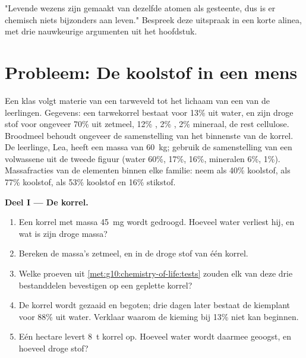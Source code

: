 \begin{exercise}[$\star\star\star$]\label{exo:g10:chemistry-of-life:15}
"Levende wezens zijn gemaakt van dezelfde atomen als gesteente, dus is
er chemisch niets bijzonders aan leven." Bespreek deze uitspraak in een
korte alinea, met drie nauwkeurige argumenten uit het hoofdstuk.
\end{exercise}

\section{Probleem: De koolstof in een mens}

\begin{problem}
\label{pb:g10:chemistry-of-life:1}
Een klas volgt materie van een tarweveld tot het lichaam van een van de
leerlingen. Gegevens: een tarwekorrel bestaat voor 13\% uit water, en
zijn droge stof voor ongeveer 70\% uit zetmeel, 12\% , 2\% ,
2\% mineraal, de rest cellulose. Broodmeel behoudt ongeveer de
samenstelling van het binnenste van de korrel. De leerlinge, Lea, heeft
een massa van \qty{60}{kg}; gebruik de samenstelling van een volwassene
uit de tweede figuur (water 60\%,  17\%,  16\%,
mineralen 6\%,  1\%). Massafracties van de elementen binnen
elke familie: neem  als 40\% koolstof,  als 77\%
koolstof,  als 53\% koolstof en 16\% stikstof.

\medskip
\noindent\textbf{Deel I --- De korrel.}
\begin{enumerate}
  \item Een korrel met massa \qty{45}{mg} wordt gedroogd. Hoeveel water
        verliest hij, en wat is zijn droge massa?
  \item Bereken de massa's zetmeel,  en  in de droge stof van
        één korrel.
  \item Welke proeven uit \cref{met:g10:chemistry-of-life:tests} zouden
        elk van deze drie bestanddelen bevestigen op een geplette
        korrel?
  \item De korrel wordt gezaaid en begoten; drie dagen later bestaat de
        kiemplant voor 88\% uit water. Verklaar waarom de kieming bij
        13\% niet kan beginnen.
  \item Eén hectare levert \qty{8}{t} korrel op. Hoeveel water wordt
        daarmee geoogst, en hoeveel droge stof?
\end{enumerate}


\end{problem}
